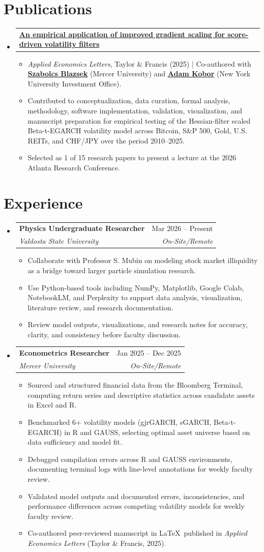 \documentclass[letterpaper,11pt]{article}
\makeatletter
\newcommand{\resumeItem}[1]{
  \item\small{
    {#1 \vspace{-1pt}}
  }
}
\newcommand{\resumeSubheading}[4]{
  \vspace{-1pt}\item
    \begin{tabular*}{0.97\textwidth}[t]{l@{\extracolsep{\fill}}r}
      \textbf{#1} & #2 \\
      \textit{\small#3} & \textit{\small #4} \\
    \end{tabular*}\vspace{-6pt}
}
\newcommand{\resumeProjectHeading}[2]{
    \item
    \begin{tabular*}{0.97\textwidth}{l@{\extracolsep{\fill}}r}
      \small#1 & #2 \\
    \end{tabular*}\vspace{-6pt}
}
\newcommand{\resumeSubHeadingListStart}{\begin{itemize}[leftmargin=0.15in, label={}]}
\newcommand{\resumeSubHeadingListEnd}{\end{itemize}}
\newcommand{\resumeItemListStart}{\begin{itemize}}
\newcommand{\resumeItemListEnd}{\end{itemize}\vspace{-5pt}}
\makeatother
\begin{document}
\section{Publications}
  \resumeSubHeadingListStart
    \resumeProjectHeading
      {\href{https://www.tandfonline.com/doi/full/10.1080/13504851.2025.2606928}{\textbf{An empirical application of improved gradient scaling for score-driven volatility filters}}}{}
    \resumeItemListStart
      \resumeItem{\textit{Applied Economics Letters}, Taylor \& Francis (2025) $|$ Co-authored with \href{https://business.mercer.edu/faculty-and-insights/faculty-directory/dr-szabolcs-blazsek/}{\textbf{Szabolcs Blazsek}} (Mercer University) and \href{https://www.linkedin.com/in/adamkobor/}{\textbf{Adam Kobor}} (New York University Investment Office).}
      \resumeItem{Contributed to conceptualization, data curation, formal analysis, methodology, software implementation, validation, visualization, and manuscript preparation for empirical testing of the Hessian-filter scaled Beta-t-EGARCH volatility model across Bitcoin, S\&P 500, Gold, U.S. REITs, and CHF/JPY over the period 2010--2025.}
      \resumeItem{Selected as 1 of 15 research papers to present a lecture at the 2026 Atlanta Research Conference.}
      \resumeItemListEnd
  \resumeSubHeadingListEnd


\section{Experience}
  \resumeSubHeadingListStart
  \resumeSubheading
      {Physics Undergraduate Researcher}{Mar 2026 – Present}
      {Valdosta State University}{On-Site/Remote}
      \resumeItemListStart
        \resumeItem{Collaborate with Professor S. Mubin on modeling stock market illiquidity as a bridge toward larger particle simulation research.}
        \resumeItem{Use Python-based tools including NumPy, Matplotlib, Google Colab, NotebookLM, and Perplexity to support data analysis, visualization, literature review, and research documentation.}
        \resumeItem{Review model outputs, visualizations, and research notes for accuracy, clarity, and consistency before faculty discussion.}
        \resumeItemListEnd
    \resumeSubheading
      {Econometrics Researcher}{Jan 2025 – Dec 2025}
      {Mercer University}{On-Site/Remote}
      \resumeItemListStart
        \resumeItem{Sourced and structured financial data from the Bloomberg Terminal, computing return series and descriptive statistics across candidate assets in Excel and R.}
        \resumeItem{Benchmarked 6+ volatility models (gjrGARCH, sGARCH, Beta-t-EGARCH) in R and GAUSS, selecting optimal asset universe based on data sufficiency and model fit.}
        \resumeItem{Debugged compilation errors across R and GAUSS environments, documenting terminal logs with line-level annotations for weekly faculty review.}
        \resumeItem{Validated model outputs and documented errors, inconsistencies, and performance differences across competing volatility models for weekly faculty review.}
        \resumeItem{Co-authored peer-reviewed manuscript in \LaTeX\ published in \textit{Applied Economics Letters} (Taylor \& Francis, 2025).}
      \resumeItemListEnd
  \resumeSubHeadingListEnd
\end{document}
